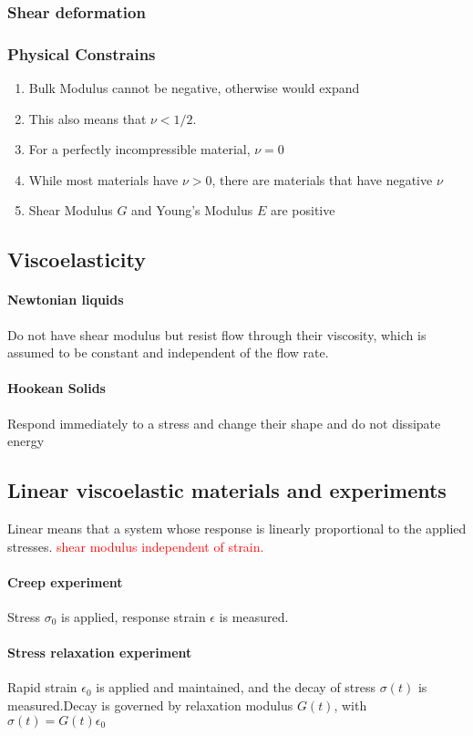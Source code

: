 \documentclass[12pt,a4paper]{article}
\begin{document}
    \subsubsection{Shear deformation}
    \subsubsection{Physical Constrains}
        \begin{enumerate}
            \item Bulk Modulus cannot be negative, otherwise would expand
            \item This also means that $\nu <1/2$.
            \item For a perfectly incompressible material, $\nu = 0$
            \item While most materials have $\nu > 0$, there are materials that have negative $\nu$
            \item Shear Modulus $G$ and Young's Modulus $E$ are positive 
        \end{enumerate}
\subsection{Viscoelasticity}
    \paragraph*{Newtonian liquids}
        Do not have shear modulus but resist flow through their viscosity, which is assumed to be constant and independent of the flow rate.
    \paragraph*{Hookean Solids}
        Respond immediately to a stress and change their shape and do not dissipate energy
\subsection{Linear viscoelastic materials and experiments}
    Linear means that a system whose response is linearly proportional to the applied stresses. \textcolor{red}{shear modulus independent of strain.}
    \paragraph*{Creep experiment}
    Stress $\sigma_0$ is applied, response strain $\epsilon$ is measured.
    \paragraph*{Stress relaxation experiment}
    Rapid strain $\epsilon_0$ is applied and maintained, and the decay of stress $\sigma(t)$ is measured.Decay is governed by relaxation modulus $G(t)$, with $\sigma(t) = G(t)\epsilon_0$
\end{document}
